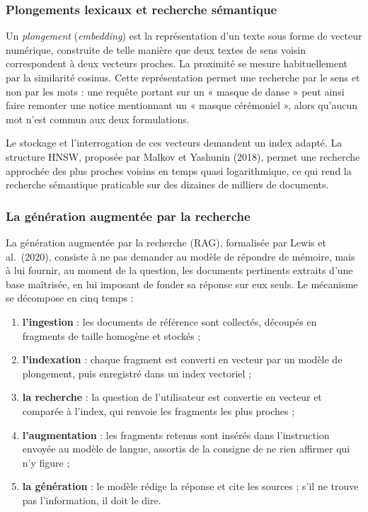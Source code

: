 \subsubsection{Plongements lexicaux et recherche sémantique}

Un \emph{plongement} (\emph{embedding}) est la représentation d'un texte sous
forme de vecteur numérique, construite de telle manière que deux textes de sens
voisin correspondent à deux vecteurs proches. La proximité se mesure
habituellement par la similarité cosinus. Cette représentation permet une
recherche par le sens et non par les mots : une requête portant sur un
« masque de danse » peut ainsi faire remonter une notice mentionnant un
« masque cérémoniel », alors qu'aucun mot n'est commun aux deux formulations.

Le stockage et l'interrogation de ces vecteurs demandent un index adapté. La
structure HNSW, proposée par Malkov et Yashunin (2018), permet une recherche
approchée des plus proches voisins en temps quasi logarithmique, ce qui rend la
recherche sémantique praticable sur des dizaines de milliers de documents.

\subsubsection{La génération augmentée par la recherche}

La génération augmentée par la recherche (RAG), formalisée par Lewis et al.\
(2020), consiste à ne pas demander au modèle de répondre de mémoire, mais à lui
fournir, au moment de la question, les documents pertinents extraits d'une base
maîtrisée, en lui imposant de fonder sa réponse sur eux seuls. Le mécanisme se
décompose en cinq temps :

\begin{enumerate}
  \item \textbf{l'ingestion} : les documents de référence sont collectés,
        découpés en fragments de taille homogène et stockés ;
  \item \textbf{l'indexation} : chaque fragment est converti en vecteur par un
        modèle de plongement, puis enregistré dans un index vectoriel ;
  \item \textbf{la recherche} : la question de l'utilisateur est convertie en
        vecteur et comparée à l'index, qui renvoie les fragments les plus
        proches ;
  \item \textbf{l'augmentation} : les fragments retenus sont insérés dans
        l'instruction envoyée au modèle de langue, assortis de la consigne de ne
        rien affirmer qui n'y figure ;
  \item \textbf{la génération} : le modèle rédige la réponse et cite les
        sources ; s'il ne trouve pas l'information, il doit le dire.
\end{enumerate}

